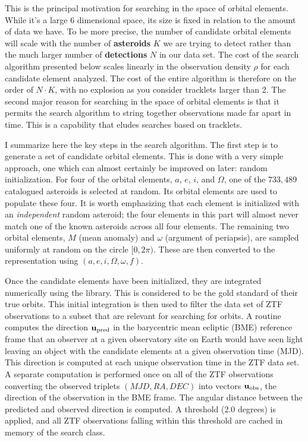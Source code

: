 This is the principal motivation for searching in the space of orbital elements.
While it's a large 6 dimensional space, its size is fixed in relation to the amount of data we have.
To be more precise, the number of candidate orbital elements will scale with the number of \textbf{asteroids} $K$ we are trying to detect
rather than the much larger number of \textbf{detections} $N$ in our data set.
The cost of the search algorithm presented below scales linearly in the observation density $\rho$ for each candidate element analyzed.
The cost of the entire algorithm is therefore on the order of $N \cdot K$, with no explosion as you consider tracklets larger than 2.
The second major reason for searching in the space of orbital elements is that it permits the search algorithm to string together observations made far apart in time.
This is a capability that eludes searches based on tracklets.

I summarize here the key steps in the search algorithm.
The first step is to generate a set of candidate orbital elements.
This is done with a very simple approach, one which can almost certainly be improved on later: random initialization.
For four of the orbital elements, $a$, $e$, $i$, and $\Omega$, one of the $733,489$ catalogued asteroids is selected at random.
Its orbital elements are used to populate these four.
It is worth emphasizing that each element is initialized with an \textit{independent} random asteroid;
the four elements in this part will almost never match one of the known asteroids across all four elements.
The remaining two orbital elements, $M$ (mean anomaly) and $\omega$ (argument of periapsis), 
are sampled uniformly at random on the circle $[0, 2 \pi)$.
These are then converted to the representation using $(a, e, i, \Omega, \omega, f)$.

Once the candidate elements have been initialized, they are integrated numerically using the  library.
This is considered to be the gold standard of their true orbits.
This initial integration is then used to filter the data set of ZTF observations to a subset that are relevant for searching for orbits.
A routine computes the direction $\mathbf{u}_{\mathrm{pred}}$ in the barycentric mean ecliptic (BME) reference frame
that an observer at a given observatory site on Earth would have seen light leaving an object with the candidate elements at a given observation time (MJD).
This direction is computed at each unique observation time in the ZTF data set.
A separate computation is performed once on all of the ZTF observations converting the observed triplets $(MJD, RA, DEC)$
into vectors $\mathbf{u}_{\mathrm{obs}}$, the direction of the observation in the BME frame.
The angular distance between the predicted and observed direction is computed.
A threshold (2.0 degrees) is applied, and all ZTF observations falling within this threshold are cached in memory of the search class.

